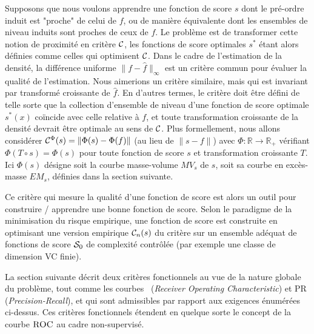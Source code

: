 Supposons que nous voulons apprendre une fonction de score $ s $ dont le pré-ordre induit est "proche" de celui de $f$, ou de manière équivalente dont les ensembles de niveau induits sont proches de ceux de $ f $. Le problème est de transformer cette notion de proximité en critère $ \crit $, les fonctions de score optimales $ s ^ * $ étant alors définies comme celles qui optimisent $ \crit $. Dans le cadre de l'estimation de la densité, la différence uniforme $ \| f - \hat f \|_\infty $ est un critère commun pour évaluer la qualité de l'estimation. Nous aimerions un critère similaire, mais qui est invariant par transformé croissante de $ \hat f $. En d'autres termes, le critère doit être défini de telle sorte que la collection d'ensemble de niveau d'une fonction de score optimale $ s ^ * (x) $ coïncide avec celle relative à $ f $, et toute transformation croissante de la densité devrait être optimale au sens de $ \crit $.
Plus formellement, nous allons considérer $ \crit ^ {\Phi} (s) = \| \Phi(s)  - \Phi (f) \| $ (au lieu de $ \| s - f \| $) 
avec $ \Phi: \mathbb {R} \to \mathbb {R} _ + $ vérifiant $ \Phi (T \circ s) = \Phi (s) $ pour toute fonction de score $ s $ et transformation croissante $ T $. Ici $ \Phi (s) $ désigne soit la courbe masse-volume $ MV_s $ de $ s $, soit sa courbe en excès-masse $ EM_s $, définies dans la section suivante.

Ce critère qui mesure la qualité d'une fonction de score est alors un outil pour construire / apprendre une bonne fonction de score.
Selon le paradigme de la minimisation du risque empirique, une fonction de score est construite en optimisant une version empirique $ \crit_n (s) $ du critère sur un ensemble adéquat de fonctions de score $ \S_0 $ de complexité contrôlée (par exemple une classe de dimension {\sc VC} finie).

La section suivante décrit deux critères fonctionnels au vue de la nature globale du problème, tout comme les courbes \roc~(\emph{Receiver Operating Characteristic}) et PR (\emph {Precision-Recall}), et qui sont admissibles par rapport aux exigences énumérées ci-dessus. Ces critères fonctionnels étendent en quelque sorte le concept de la courbe $ \roc $ au cadre non-supervisé.

